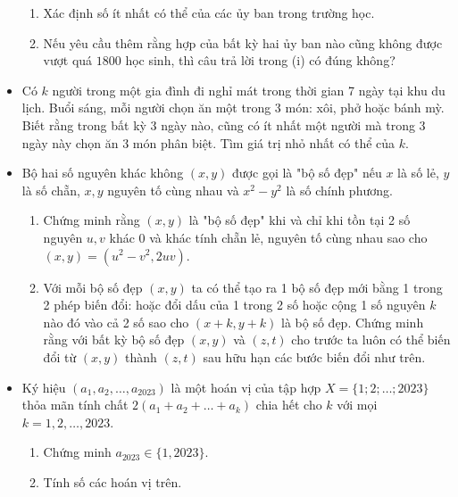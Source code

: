 \documentclass[11pt]{scrartcl}
\begin{document}
\begin{itemize}[label=, leftmargin=0em, itemsep=0.5em]
\begin{btvn}
        \begin{enumerate}
            \item Xác định số ít nhất có thể của các ủy ban trong trường học.
            \item Nếu yêu cầu thêm rằng hợp của bất kỳ hai ủy ban nào cũng không được vượt quá $1800$ học sinh, thì câu trả lời trong (i) có đúng không?
        \end{enumerate}
    \end{btvn}
    \item \begin{btvn} Có $k$ người trong một gia đình đi nghỉ mát trong thời gian 7 ngày tại khu du lịch. Buổi sáng, mỗi người chọn ăn một trong 3 món: xôi, phở hoặc bánh mỳ. Biết rằng trong bất kỳ 3 ngày nào, cũng có ít nhất một người mà trong 3 ngày này chọn ăn 3 món phân biệt. Tìm giá trị nhỏ nhất có thể của $k$.
        
    \end{btvn}
    
    \item \begin{btvn}
    Bộ hai số nguyên khác không $(x, y)$ được gọi là "bộ số đẹp" nếu $x$ là số lẻ, $y$ là số chẵn, $x, y$ nguyên tố cùng nhau và $x^2 - y^2$ là số chính phương.
    \begin{enumerate}
        \item Chứng minh rằng $(x, y)$ là "bộ số đẹp" khi và chỉ khi tồn tại 2 số nguyên $u, v$ khác $0$ và khác tính chẵn lẻ, nguyên tố cùng nhau sao cho $(x, y) = (u^2 - v^2, 2uv)$.
        \item Với mỗi bộ số đẹp $(x, y)$ ta có thể tạo ra 1 bộ số đẹp mới bằng 1 trong 2 phép biến đổi: hoặc đổi dấu của 1 trong 2 số hoặc cộng 1 số nguyên $k$ nào đó vào cả 2 số sao cho $(x + k, y + k)$ là bộ số đẹp. Chứng minh rằng với bất kỳ bộ số đẹp $(x, y)$ và $(z, t)$ cho trước ta luôn có thể biến đổi từ $(x, y)$ thành $(z, t)$ sau hữu hạn các bước biến đổi như trên.
    \end{enumerate}
    
    \end{btvn}
    \item \begin{btvn} Ký hiệu $(a_1, a_2, \ldots, a_{2023})$ là một hoán vị của tập hợp $X = \{1; 2; \ldots; 2023\}$ thỏa mãn tính chất $2(a_1 + a_2 + \ldots + a_k)$ chia hết cho $k$ với mọi $k = 1, 2, \ldots, 2023$.
        \begin{enumerate}
            \item Chứng minh $a_{2023} \in \{1, 2023\}$.
            \item Tính số các hoán vị trên.
        \end{enumerate}
    \end{btvn}


\end{itemize}
\end{document}
